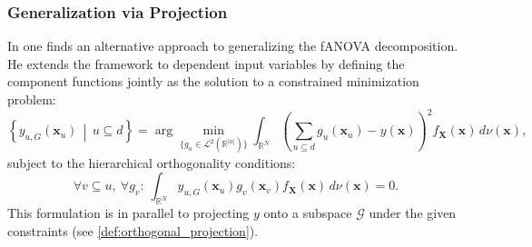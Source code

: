 \subsubsection{Generalization via Projection}
In \cite{hooker2007} one finds an alternative approach to generalizing the fANOVA decomposition. He extends the framework to dependent input variables by defining the component 
functions jointly as the solution to a constrained minimization problem:
\begin{equation}
\left\{ y_{u, G}(\boldsymbol{x}_u) \,\middle|\, u \subseteq d \right\}
= \arg\min_{\{g_u \in \mathcal{L}^2(\mathbb{R}^{|u|})\}} 
\int_{\mathbb{R}^N} \left( \sum_{u \subseteq d} g_u(\boldsymbol{x}_u) - y(\boldsymbol{x}) \right)^2 
f_{\boldsymbol{X}}(\boldsymbol{x}) \, d \nu (\boldsymbol{x}),
\label{eq:generalized_fanova_components_hooker}
\end{equation}
subject to the hierarchical orthogonality conditions:
\begin{equation}
    \forall v \subseteq u,\ \forall g_v:\ 
    \int_{\mathbb{R}^N} y_{u, G}(\boldsymbol{x}_u) g_v(\boldsymbol{x}_v) 
    f_{\boldsymbol{X}}(\boldsymbol{x}) \, d \nu (\boldsymbol{x}) = 0.
\label{eq:hooker_hierarchical_orthogonality}
\end{equation}
This formulation is in parallel to projecting $y$ onto a subspace 
$\mathcal{G}$ under the given constraints (see \autoref{def:orthogonal_projection}).

